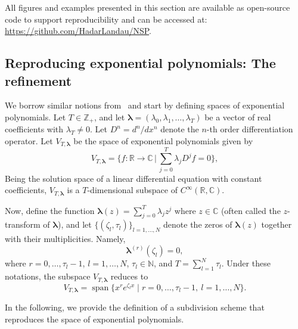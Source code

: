 \documentclass[11pt,a4paper]{article}
\theoremstyle{definition}
\begin{document}
All figures and examples presented in this section are available as open-source code to support reproducibility and can be accessed at: \url{https://github.com/HadarLandau/NSP}.

\subsection{Reproducing exponential polynomials: The refinement}

We borrow similar notions from~\cite{conti2011algebraic} and start by defining spaces of exponential polynomials. Let $T \in \mathbb{Z}_+$, and let $\boldsymbol{\lambda}=(\lambda_0,\lambda_1, \dots, \lambda_T)$ be a vector of real coefficients with $\lambda_T \neq 0$. Let $D^n=d^n/dx^n$ denote the $n$-th order
differentiation operator. Let $V_{T,\boldsymbol{\lambda}}$ be the space of exponential polynomials given by
\begin{equation}
    V_{T,\boldsymbol{\lambda}} = \bigg\{ f \colon \mathbb{R} \rightarrow \mathbb{C} \, \big| \, \sum_{j=0}^T \lambda_j D^j f=0 \bigg\},
\end{equation}
Being the solution space of a linear differential equation with constant coefficients, $V_{T,\boldsymbol{\lambda}}$ is a $T$-dimensional subspace of $C^\infty(\mathbb{R},\mathbb{C})$.

Now, define the function $\boldsymbol{\lambda}(z)=\sum^T_{j=0} \lambda_j z^j$ where $z\in\mathbb{C}$ (often called the $z$-transform of $\boldsymbol{\lambda}$), and let $\{(\zeta_l,\tau_l)\}_{l=1,\dots,N}$ denote the zeros of $\boldsymbol{\lambda}(z)$ together with their multiplicities. Namely,
\[
     \boldsymbol{\lambda}^{(r)}(\zeta_l)=0, 
\]
where $r=0,\dots,\tau_l -1$, $l=1,\dots,N$, $\tau_l \in \mathbb{N}$, and $T=\textstyle\sum_{l=1}^N \tau_l$. Under these notations, the subspace $V_{T,\boldsymbol{\lambda}}$ reduces to
\begin{equation}
    V_{T,\boldsymbol{\lambda}}=\operatorname{span} \{x^r e^{\zeta_l x} \;|\; r=0,\dots,\tau_l -1, \ l=1,\dots,N \}.
\end{equation}

In the following, we provide the definition of a subdivision scheme that reproduces the space of exponential polynomials. 
\end{document}
